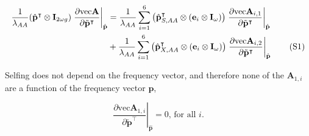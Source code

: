 \documentclass[11pt]{article}
\newcommand\numberthis{\addtocounter{equation}{1}\tag{\theequation}}
\def\mbf#1{\mathbf{#1}}
\begin{document}
\begin{align*}
	\frac{1}{\lambda_{AA}}(\hat{\mbf{p}}^{\intercal} \otimes \mbf{I}_{2 \omega g}) \left. \frac{ \partial \text{vec}\mbf{A}}{\partial \tilde{\mbf{p}}^{\intercal}} \right|_{\hat{\mbf{p}}} &= \frac{1}{\lambda_{AA}} \sum^{6}_{i=1} \big( \hat{\mbf{p}}^{\intercal}_{S,AA} \otimes (\mbf{e}_{i} \otimes \mbf{I}_{\omega}) \big) \left. \frac{ \partial \text{vec}\mbf{A}_{i,1}}{\partial \tilde{\mbf{p}}^{\intercal}} \right|_{\hat{\mbf{p}}} \\
		&+ \frac{1}{\lambda_{AA}} \sum^{6}_{i=1} \big( \hat{\mbf{p}}^{\intercal}_{X,AA} \otimes (\mbf{e}_{i} \otimes \mbf{I}_{\omega}) \big) \left. \frac{ \partial \text{vec}\mbf{A}_{i,2}}{\partial \tilde{\mbf{p}}^{\intercal}} \right|_{\hat{\mbf{p}}} \numberthis
\end{align*}

\noindent Selfing does not depend on the frequency vector, and therefore none of the $\mbf{A}_{1,i}$ are a function of the frequency vector $\mbf{p}$,

\begin{equation}
	\left. \frac{ \partial \text{vec}\mbf{A}_{1,i}}{\partial \tilde{\mbf{p}}^{\intercal}} \right|_{\hat{\mbf{p}}} = 0,\,\text{for all }i. 
\end{equation}
\end{document}
